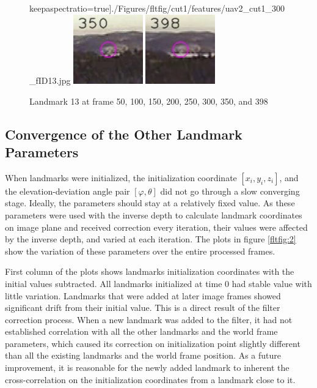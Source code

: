 \begin{figure}[h]
keepaspectratio=true]{./Figures/fltfig/cut1/features/uav2_cut1_300_fID13.jpg}
\includegraphics[width=3cm,
keepaspectratio=true]{./Figures/fltfig/cut1/features/uav2_cut1_350_fID13.jpg}
\includegraphics[width=3cm,
keepaspectratio=true]{./Figures/fltfig/cut1/features/uav2_cut1_398_fID13.jpg}
\caption{Landmark 13 at frame 50, 100, 150, 200, 250, 300, 350, and 398}
\label{fltfig:1_1}
\end{figure}

\subsection{Convergence of the Other Landmark Parameters}
When landmarks were initialized, the initialization coordinate $[x_i,
y_i, z_i]$, and the elevation-deviation angle pair $[\varphi, \theta]$
did not go through a slow converging stage. Ideally, the parameters
should stay at a relatively fixed value. As these parameters were used
with the inverse depth to calculate landmark coordinates on image
plane and received correction every iteration, their values were
affected by the inverse depth, and varied at each iteration. The plots
in figure \ref{fltfig:2} show the variation of these parameters over
the entire processed frames.

First column of the plots shows landmarks initialization coordinates
with the initial values subtracted. All landmarks initialized
at time 0 had stable value with little variation.
Landmarks that were added at later image frames showed significant
drift from their initial value. This is a direct result of the filter
correction process. When a new landmark was added to the filter, it
had not established correlation with all the other landmarks and the
world frame parameters, which caused its correction on initialization
point slightly different than all the existing landmarks and the world
frame position. As a future improvement, it is reasonable for the
newly added landmark to inherent the cross-correlation on the
initialization coordinates from a landmark close to it. 

